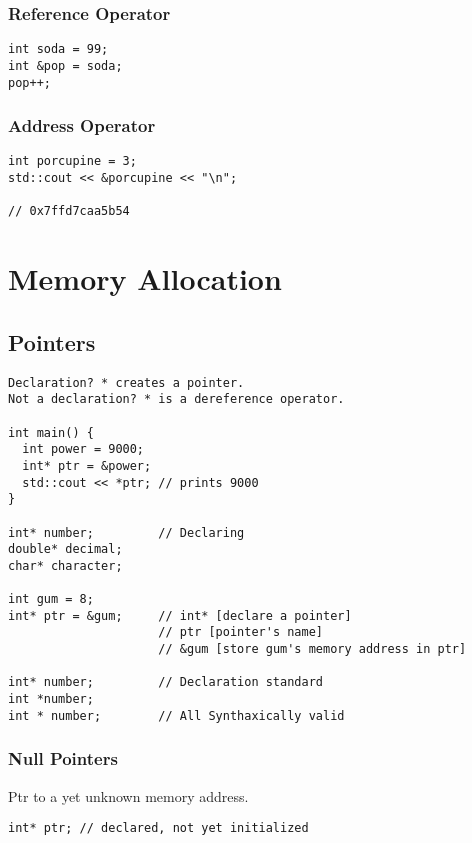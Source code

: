 \documentclass[openany]{report}
\begin{document}
\subsection{Reference Operator}

\begin{verbatim}
int soda = 99; 
int &pop = soda;
pop++;
\end{verbatim}

\subsection{Address Operator}

\begin{verbatim}
int porcupine = 3; 
std::cout << &porcupine << "\n"; 

// 0x7ffd7caa5b54
\end{verbatim}

\chapter{Memory Allocation}
\section{Pointers}

\begin{verbatim}
Declaration? * creates a pointer.
Not a declaration? * is a dereference operator.

int main() {
  int power = 9000;
  int* ptr = &power;
  std::cout << *ptr; // prints 9000
}

int* number;         // Declaring
double* decimal;
char* character;

int gum = 8;
int* ptr = &gum;     // int* [declare a pointer]
                     // ptr [pointer's name]
                     // &gum [store gum's memory address in ptr]

int* number;         // Declaration standard
int *number;
int * number;        // All Synthaxically valid

\end{verbatim}

\subsection{Null Pointers}

Ptr to a yet unknown memory address.

\begin{verbatim}
int* ptr; // declared, not yet initialized
\end{verbatim}
\end{document}
